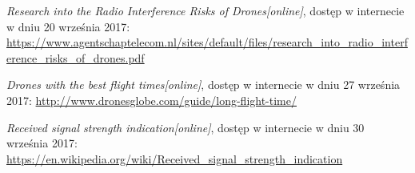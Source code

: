\begin{thebibliography}{99}
 \emph{Research into the Radio Interference Risks of Drones[online]}, dostęp w internecie w dniu 20 września 2017:
 \url{https://www.agentschaptelecom.nl/sites/default/files/research_into_radio_interference_risks_of_drones.pdf}

 \emph{Drones with the best flight times[online]}, dostęp w internecie w dniu 27 września 2017:
 \url{http://www.dronesglobe.com/guide/long-flight-time/}

 \emph{Received signal strength indication[online]}, dostęp w internecie w dniu 30 września 2017:
 \url{https://en.wikipedia.org/wiki/Received_signal_strength_indication}
\end{thebibliography}

